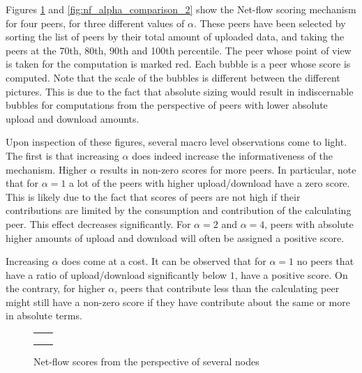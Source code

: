 \documentclass[a4paper,11pt]{book}
\theoremstyle{definition}
\begin{document}
Figures \ref{fig:nf_alpha_comparison_1} and \ref{fig:nf_alpha_comparison_2}
show the Net-flow scoring mechanism for four peers, for three
different values of $\alpha$. These peers have been selected by sorting the list of peers by their total
amount of uploaded data, and taking the peers at the 70th, 80th, 90th and 100th percentile.
The peer whose point of view is taken for the computation is marked red. Each bubble is a peer whose
score is computed. Note that the scale of the bubbles is different between the different pictures. 
This is due to the fact that absolute sizing would result in indiscernable bubbles for computations
from the perspective of peers with lower absolute upload and download amounts. 

Upon inspection of these figures, several macro level observations come to light. The first
is that increasing $\alpha$ does indeed increase the informativeness of the mechanism.
Higher $\alpha$ results in non-zero scores for more peers. In particular, note that
for $\alpha=1$ a lot of the peers with higher upload/download have a zero score. This is
likely due to the fact that scores of peers are not high if their contributions are limited
by the consumption and contribution of the calculating peer. This effect decreases
significantly. For $\alpha=2$ and $\alpha=4$, peers with absolute higher amounts of upload
and download will often be assigned a positive score. 

Increasing $\alpha$ does come at a cost. It can be observed that for $\alpha=1$ no peers
that have a ratio of upload/download significantly below $1$, have a positive score. 
On the contrary, for higher $\alpha$, peers that contribute less than the calculating
peer might still have a non-zero score if they have contribute about the same or more
in absolute terms.

\begin{figure}[ht]
    \begin{tabular}[ht]{cc}
         &
         \\

         &
         \\

         &
         \\
    \end{tabular}
    \caption{Net-flow scores from the perspective of several nodes}
    \label{fig:nf_alpha_comparison_1}
\end{figure}
\end{document}
